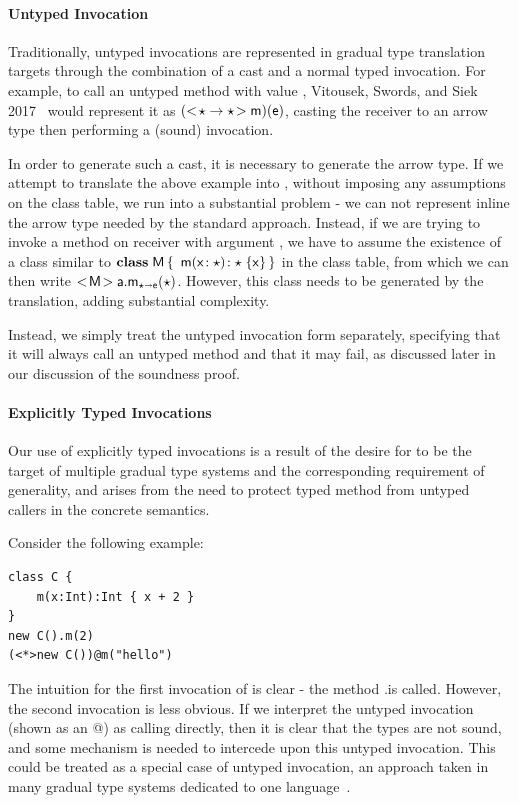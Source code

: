 \documentclass[a4paper,USenglish]{tex/lipics-v2016}
\begin{document}
\paragraph{Untyped Invocation}

Traditionally, untyped invocations are represented in gradual type translation
targets through the combination of a cast and a normal typed invocation. For
example, to call an untyped method \m with value \e, Vitousek, Swords, and
Siek 2017~\cite{Vitousek2017} would represent it as $(\SubCast{\any
\rightarrow\any}{\m})(\e)$, casting the receiver to an arrow type then 
performing a (sound) invocation. 

In order to generate such a cast, it is necessary to generate the arrow type.
If we attempt to translate the above example into \kafka, without imposing any
assumptions on the class table, we run into a substantial problem -  we can
not represent inline the arrow type needed by the standard approach. Instead,
if we are trying to invoke a method \m on receiver \a with argument \e, we
have to assume the existence of a class similar to ${\sf{\bf class}}\;{\sf{M}}\,\{\,~ { {\sf{m}}( {{\sf{x}}}\!:{\star})}\!:{\star}\;\{{{\sf{x}}}\}\,\}$ in the class table, from which we can then write
$\KCall{\SubCast{\xt M}\a}\m\any\any\e$. However, this class needs to be
generated by the translation, adding substantial complexity.

Instead, we simply treat the untyped invocation form separately, specifying
that it will always call an untyped method and that it may fail, as discussed
later in our discussion of the \kafka soundness proof.

\paragraph{Explicitly Typed Invocations}

Our use of explicitly typed invocations is a result of the desire for \kafka
to be the target of multiple gradual type systems and the corresponding
requirement of generality, and arises from the need to protect typed  method
from untyped callers in the concrete semantics.

Consider the following example:

\begin{verbatim}
class C {
    m(x:Int):Int { x + 2 }
}
new C().m(2)
(<*>new C())@m("hello")
\end{verbatim}

The intuition for the first invocation of \m is clear - the method \C.\m is called.
However, the second invocation is less obvious. If we interpret the untyped
invocation (shown as an @) as calling \m directly, then it is clear that the types 
are not sound, and some mechanism is needed to intercede upon this untyped invocation.
This could be treated as a special case of untyped invocation, an approach taken in
many gradual type systems dedicated to one language~\cite{popl10,ecoop15,Muehlboeck2017}.
\end{document}
